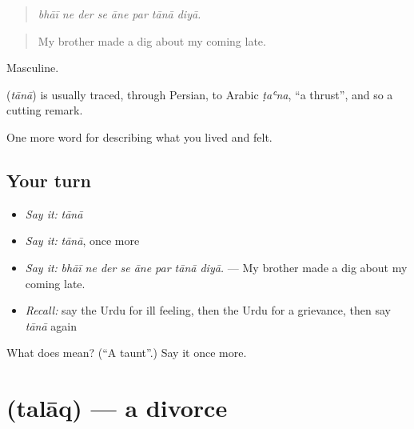 \begin{quote}
       
\end{quote}

\begin{quote}
\emph{bhāī ne der se āne par tānā diyā.}
\end{quote}

\begin{quote}
My brother made a dig about my coming late.
\end{quote}

Masculine.

\begin{cousinweb}
\textbf{} (\emph{tānā}) is usually traced, through Persian, to Arabic \emph{ṭaʿna}, \textquotedblleft{}a thrust\textquotedblright{}, and so a cutting remark.
\end{cousinweb}

\begin{grammarlens}[title={What you've built}]
One more word for describing what you lived and felt.
\end{grammarlens}

\subsection*{Your turn}
\begin{itemize}
\raggedright
  \item \emph{Say it:} \emph{tānā}
  \item \emph{Say it:} \emph{tānā}, once more
  \item \emph{Say it:} \emph{bhāī ne der se āne par tānā diyā.} — My brother made a dig about my coming late.
  \item \emph{Recall:} say the Urdu for ill feeling, then the Urdu for a grievance, then say \emph{tānā} again
\end{itemize}

\begin{tcolorbox}[breakable,colback=teal!4,colframe=teal!35!black,title={Before you move on}]
What does  mean? (\textquotedblleft{}A taunt\textquotedblright{}.) Say it once more.
\end{tcolorbox}
\section[\texorpdfstring{\ur{طلاق} (talāq)}{طلاق (talāq)}]{ (talāq) — a divorce}

\label{lesson:UR-C491-talaq}




